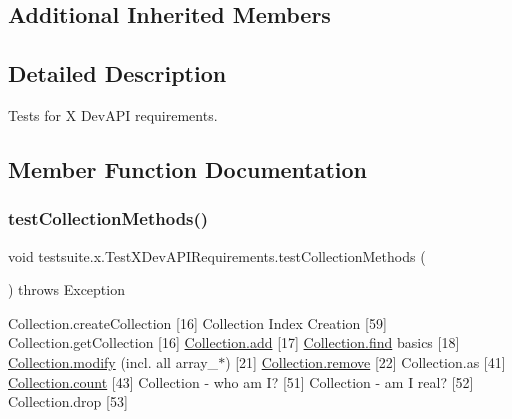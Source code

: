\subsection*{Additional Inherited Members}


\subsection{Detailed Description}
Tests for X Dev\+A\+PI requirements. 

\subsection{Member Function Documentation}
\mbox{\label{classtestsuite_1_1x_1_1_test_x_dev_a_p_i_requirements_aa06285f6ab2ccc7793e5f7e09528e3e6}} 
\subsubsection{\texorpdfstring{test\+Collection\+Methods()}{testCollectionMethods()}}
{\footnotesize\ttfamily void testsuite.\+x.\+Test\+X\+Dev\+A\+P\+I\+Requirements.\+test\+Collection\+Methods (\begin{DoxyParamCaption}{ }\end{DoxyParamCaption}) throws Exception}

Collection.\+create\+Collection \mbox{[}16\mbox{]} Collection Index Creation \mbox{[}59\mbox{]} Collection.\+get\+Collection \mbox{[}16\mbox{]} \mbox{\hyperlink{interfacecom_1_1mysql_1_1cj_1_1xdevapi_1_1_collection_a93ea1bd694426124c92aa5ae3bf29d2b}{Collection.\+add}} \mbox{[}17\mbox{]} \mbox{\hyperlink{interfacecom_1_1mysql_1_1cj_1_1xdevapi_1_1_collection_acb0746735df861e86f37d50f4a6b67f0}{Collection.\+find}} basics \mbox{[}18\mbox{]} \mbox{\hyperlink{interfacecom_1_1mysql_1_1cj_1_1xdevapi_1_1_collection_ad98b2d273d43ca6a029979c82e2d250a}{Collection.\+modify}} (incl. all array\+\_\+$\ast$) \mbox{[}21\mbox{]} \mbox{\hyperlink{interfacecom_1_1mysql_1_1cj_1_1xdevapi_1_1_collection_aff45631a403d8370067af7c4f0a4fab1}{Collection.\+remove}} \mbox{[}22\mbox{]} Collection.\+as \mbox{[}41\mbox{]} \mbox{\hyperlink{interfacecom_1_1mysql_1_1cj_1_1xdevapi_1_1_collection_a515922bba92c3d82c776095a2692dcd2}{Collection.\+count}} \mbox{[}43\mbox{]} Collection -\/ who am I? \mbox{[}51\mbox{]} Collection -\/ am I real? \mbox{[}52\mbox{]} Collection.\+drop \mbox{[}53\mbox{]}


